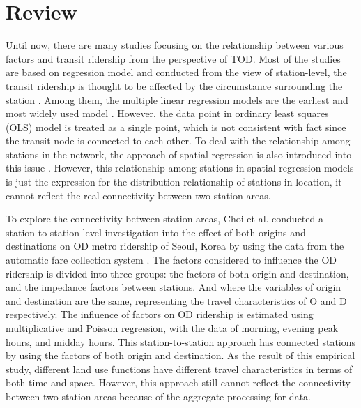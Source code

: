 \section{Review}
%
Until now, there are many studies focusing on the relationship between various factors and transit ridership from the perspective of TOD. Most of the studies are based on regression model and conducted from the view of station-level, the transit ridership is thought to be affected by the circumstance surrounding the station \cite{cervero1997travel,taylor2003analyzing,zhao2005transit,estupinan2008relationship,taylor2009nature,sohn2010factors,gutierrez2011transit,jun2015land}. Among them, the multiple linear regression models are the earliest and most widely used model \cite{cervero1997travel,gutierrez2011transit}. However, the data point in ordinary least squares (OLS) model is treated as a single point, which is not consistent with fact since the transit node is connected to each other. To deal with the relationship among stations in the network, the approach of spatial regression is also introduced into this issue \cite{cardozo2012application,jun2015land}. However, this relationship among stations in spatial regression models is just the expression for the distribution relationship of stations in location, it cannot reflect the real connectivity between two station areas.

%
To explore the connectivity between station areas, Choi et al. conducted a station-to-station level investigation into the effect of both origins and destinations on OD metro ridership of Seoul, Korea by using the data from the automatic fare collection system \cite{choi2012analysis}. The factors considered to influence the OD ridership is divided into three groups: the factors of both origin and destination, and the impedance factors between stations. And where the variables of origin and destination are the same, representing the travel characteristics of O and D respectively. The influence of factors on OD ridership is estimated using multiplicative and Poisson regression, with the data of morning, evening peak hours, and midday hours. This station-to-station approach has connected stations by using the factors of both origin and destination. As the result of this empirical study, different land use functions have different travel characteristics in terms of both time and space. However, this approach still cannot reflect the connectivity between two station areas because of the aggregate processing for data.

